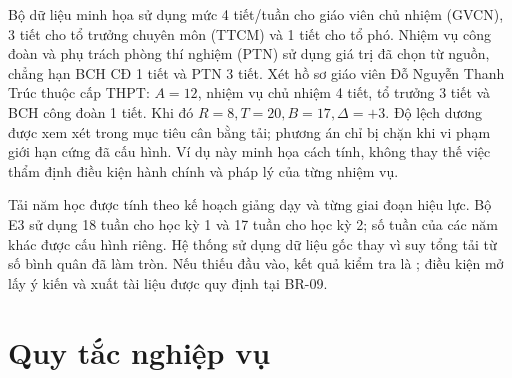 \documentclass[12pt,a4paper]{report}
\newcommand{\code}[1]{\texttt{\detokenize{#1}}}
\begin{document}
Bộ dữ liệu minh họa sử dụng mức 4 tiết/tuần cho giáo viên chủ nhiệm (GVCN), 3 tiết cho tổ trưởng chuyên môn (TTCM) và 1 tiết cho tổ phó. Nhiệm vụ công đoàn và phụ trách phòng thí nghiệm (PTN) sử dụng giá trị đã chọn từ nguồn, chẳng hạn BCH CĐ 1 tiết và PTN 3 tiết. Xét hồ sơ giáo viên Đỗ Nguyễn Thanh Trúc thuộc cấp THPT: $A=12$, nhiệm vụ chủ nhiệm 4 tiết, tổ trưởng 3 tiết và BCH công đoàn 1 tiết. Khi đó $R=8,T=20,B=17,\Delta=+3$. Độ lệch dương được xem xét trong mục tiêu cân bằng tải; phương án chỉ bị chặn khi vi phạm giới hạn cứng đã cấu hình. Ví dụ này minh họa cách tính, không thay thế việc thẩm định điều kiện hành chính và pháp lý của từng nhiệm vụ.

Tải năm học được tính theo kế hoạch giảng dạy và từng giai đoạn hiệu lực. Bộ E3 sử dụng 18 tuần cho học kỳ 1 và 17 tuần cho học kỳ 2; số tuần của các năm khác được cấu hình riêng. Hệ thống sử dụng dữ liệu gốc thay vì suy tổng tải từ số bình quân đã làm tròn. Nếu thiếu đầu vào, kết quả kiểm tra là \code{INSUFFICIENT_DATA}; điều kiện mở lấy ý kiến và xuất tài liệu được quy định tại BR-09.

\section{Quy tắc nghiệp vụ}\label{sec:business-rules}
\end{document}
